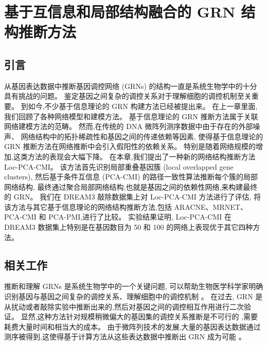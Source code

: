 \section{基于互信息和局部结构融合的 GRN 结构推断方法}
\label{sec:locpcacmi}

\subsection{引言}

从基因表达数据中推断基因调控网络 (GRNs) 的结构一直是系统生物学中的十分具有挑战的问题。
鉴定基因之间复杂的调控关系对于理解细胞的调控机制至关重要。
到如今,不少基于信息理论的 GRN 构建方法已经被提出来。
在上一章里面, 我们回顾了各种网络模型和建模方法。
基于信息理论的 GRN 推断方法属于关联网络建模方法的范畴。
然而,在传统的 DNA 微阵列测序数据中由于存在的外部噪声、
网络结构中的拓扑稀疏性和基因之间的传递依赖等因素,
使得基于信息理论的 GRN 推断方法在网络推断中会引入假阳性的依赖关系。
特别是随着网络规模的增加,这类方法的表现会大幅下降。
在本章,我们提出了一种新的网络结构推断方法 Loc-PCA-CMI。
该方法首先识别局部重叠基因簇 (local overlapped gene clusters),
然后基于条件互信息 (PCA-CMI) 的路径一致性算法推断每个簇的局部网络结构,
最终通过聚合局部网络结构,也就是基因之间的依赖性网络,来构建最终的 GRN。
我们在 DREAM3 敲除数据集上对 Loc-PCA-CMI 方法进行了评估,
将该方法与其它基于信息理论的网络结构推断方法,包括 ARACNE、MRNET、PCA-CMI 和 PCA-PMI,进行了比较。
实验结果证明, Loc-PCA-CMI 在 DREAM3 数据集上特别是在基因数目为 50 和 100 的网络上表现优于其它四种方法。

\subsection{相关工作}
\label{subsec:relatedwork}

推断和理解 GRNs 是系统生物学中的一个关键问题, 
可以帮助生物医学科学家明确识别基因与基因之间复杂的调控关系、理解细胞中的调控机制 。
在过去, GRN 是从扰动或者敲除实验中推断出来的,然后对基因之间的调控相互作用进行二次验证。
显然,这种方法针对规模稍微偏大的基因集的调控关系推断是不可行的 ,需要耗费大量时间和相当大的成本。
由于微阵列技术的发展,大量的基因表达数据通过测序被得到,这使得基于计算方法从这些表达数据中推断出 GRN 成为可能 。

